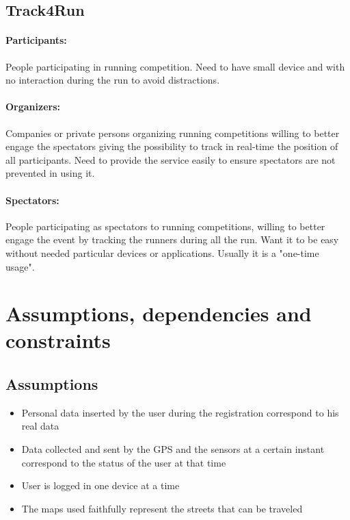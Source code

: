 \documentclass{report}
\begin{document}
			\subsection{Track4Run}
			\paragraph{Participants:}
			People participating in running competition. Need to have small device and with no interaction during the run to avoid distractions.
			\paragraph{Organizers:}
			Companies or private persons organizing running competitions willing to better engage the spectators giving the possibility to track in real-time the position of all participants. Need to provide the service easily to ensure spectators are not prevented in using it.
			\paragraph{Spectators:}
			People participating as spectators to running competitions, willing to better engage the event by tracking the runners during all the run. Want it to be easy without needed particular devices or applications. Usually it is a "one-time usage".
		\section{Assumptions, dependencies and constraints}
			\subsection{Assumptions}
			 	\begin{itemize}
				 	\item Personal data inserted by the user during the registration correspond to his real data
					\item Data collected and sent by the GPS and the sensors at a certain instant correspond to the status of the user at that time
				
					\item User is logged in one device at a time

					\item The maps used faithfully represent the streets that can be traveled
					
				\end{itemize}
					
\end{document}
